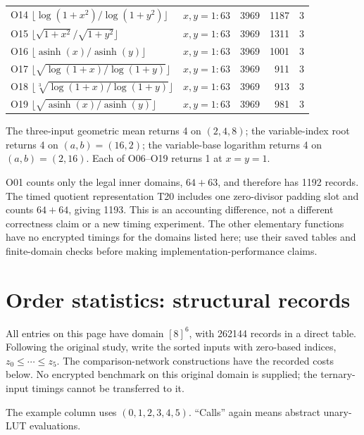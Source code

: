 \documentclass[a4paper,10pt]{article}
\begin{document}
\begin{longtable}{@{}p{76mm}p{38mm}rrr@{}}
O14 $\lfloor\log(1+x^2)/\log(1+y^2)\rfloor$ & $x,y=1:63$ & 3969 & 1187 & 3\\
O15 $\lfloor\sqrt{1+x^2}/\sqrt{1+y^2}\rfloor$ & $x,y=1:63$ & 3969 & 1311 & 3\\
O16 $\lfloor\operatorname{asinh}(x)/\operatorname{asinh}(y)\rfloor$ & $x,y=1:63$ & 3969 & 1001 & 3\\
O17 $\lfloor\sqrt{\log(1+x)/\log(1+y)}\rfloor$ & $x,y=1:63$ & 3969 & 911 & 3\\
O18 $\lfloor\sqrt[3]{\log(1+x)/\log(1+y)}\rfloor$ & $x,y=1:63$ & 3969 & 913 & 3\\
O19 $\lfloor\sqrt{\operatorname{asinh}(x)/\operatorname{asinh}(y)}\rfloor$ & $x,y=1:63$ & 3969 & 981 & 3\\
\bottomrule\end{longtable}

The three-input geometric mean returns 4 on $(2,4,8)$; the variable-index root returns 4 on $(a,b)=(16,2)$; the variable-base logarithm returns 4 on $(a,b)=(2,16)$. Each of O06--O19 returns 1 at $x=y=1$.

O01 counts only the legal inner domains, $64+63$, and therefore has 1192 records. The timed quotient representation T20 includes one zero-divisor padding slot and counts $64+64$, giving 1193. This is an accounting difference, not a different correctness claim or a new timing experiment. The other elementary functions have no encrypted timings for the domains listed here; use their saved tables and finite-domain checks before making implementation-performance claims.

\newpage
\section{Order statistics: structural records}
All entries on this page have domain $[8]^6$, with 262144 records in a direct table. Following the original study, write the sorted inputs with zero-based indices, $z_0\le\cdots\le z_5$. The comparison-network constructions have the recorded costs below. No encrypted benchmark on this original domain is supplied; the ternary-input timings cannot be transferred to it.

The example column uses $(0,1,2,3,4,5)$. ``Calls'' again means abstract unary-LUT evaluations.
\end{document}
